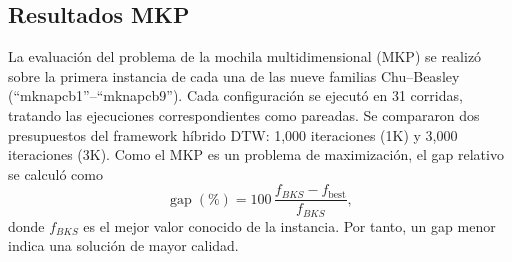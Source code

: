 
\subsection{Resultados MKP}
\label{sec:resultados-mkp}

La evaluación del problema de la mochila multidimensional (MKP) se realizó
sobre la primera instancia de cada una de las nueve familias Chu--Beasley
(``mknapcb1''--``mknapcb9''). Cada configuración se ejecutó en 31 corridas, tratando las ejecuciones correspondientes como pareadas. Se compararon dos presupuestos del framework híbrido DTW: 1,000 iteraciones (1K) y 3,000 iteraciones (3K). Como
el MKP es un problema de maximización, el gap relativo se calculó como
\begin{equation}
  \operatorname{gap}(\%) = 100\,\frac{f_{BKS}-f_{\mathrm{best}}}{f_{BKS}},
  \label{eq:mkp-gap}
\end{equation}
donde $f_{BKS}$ es el mejor valor conocido de la instancia. Por tanto, un
gap menor indica una solución de mayor calidad.

\begin{table}[htbp]
\centering
\caption{Resumen de resultados del framework híbrido DTW con 3,000 iteraciones
en las nueve instancias MKP.}
\label{tab:mkp-resumen-3k}
\scriptsize
{}
\end{table}

